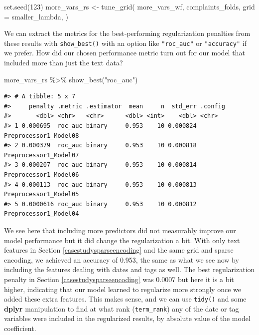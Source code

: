 \documentclass[
]{krantz}
\makeatletter
\newenvironment{Shaded}{\begin{snugshade}}{\end{snugshade}}
\newcommand{\AttributeTok}[1]{\textcolor[rgb]{0.77,0.63,0.00}{#1}}
\newcommand{\DecValTok}[1]{\textcolor[rgb]{0.00,0.00,0.81}{#1}}
\newcommand{\FunctionTok}[1]{\textcolor[rgb]{0.00,0.00,0.00}{#1}}
\newcommand{\NormalTok}[1]{#1}
\newcommand{\OtherTok}[1]{\textcolor[rgb]{0.56,0.35,0.01}{#1}}
\newcommand{\SpecialCharTok}[1]{\textcolor[rgb]{0.00,0.00,0.00}{#1}}
\newcommand{\StringTok}[1]{\textcolor[rgb]{0.31,0.60,0.02}{#1}}
\newenvironment{kframe}{%
\medskip{}
\setlength{\fboxsep}{.8em}
 \def\at@end@of@kframe{}%
 \ifinner\ifhmode%
  \def\at@end@of@kframe{\end{minipage}}%
  \begin{minipage}{\columnwidth}%
 \fi\fi%
 \def\FrameCommand##1{\hskip\@totalleftmargin \hskip-\fboxsep
 \colorbox{shadecolor}{##1}\hskip-\fboxsep
     \hskip-\linewidth \hskip-\@totalleftmargin \hskip\columnwidth}%
 \MakeFramed {\advance\hsize-\width
   \@totalleftmargin\z@ \linewidth\hsize
   \@setminipage}}%
 {\par\unskip\endMakeFramed%
 \at@end@of@kframe}
\renewenvironment{Shaded}{\begin{kframe}}{\end{kframe}}
\makeatother
\begin{document}
\begin{Shaded}
\begin{Highlighting}[]
\FunctionTok{set.seed}\NormalTok{(}\DecValTok{123}\NormalTok{)}
\NormalTok{more\_vars\_rs }\OtherTok{\textless{}{-}} \FunctionTok{tune\_grid}\NormalTok{(}
\NormalTok{  more\_vars\_wf,}
\NormalTok{  complaints\_folds,}
  \AttributeTok{grid =}\NormalTok{ smaller\_lambda,}
\NormalTok{)}
\end{Highlighting}
\end{Shaded}

We can extract the metrics for the best-performing regularization penalties from these results with \texttt{show\_best()} with an option like \texttt{"roc\_auc"} or \texttt{"accuracy"} if we prefer. How did our chosen performance metric turn out for our model that included more than just the text data?

\begin{Shaded}
\begin{Highlighting}[]
\NormalTok{more\_vars\_rs }\SpecialCharTok{\%\textgreater{}\%}
  \FunctionTok{show\_best}\NormalTok{(}\StringTok{"roc\_auc"}\NormalTok{)}
\end{Highlighting}
\end{Shaded}

\begin{verbatim}
#> # A tibble: 5 x 7
#>     penalty .metric .estimator  mean     n  std_err .config              
#>       <dbl> <chr>   <chr>      <dbl> <int>    <dbl> <chr>                
#> 1 0.000695  roc_auc binary     0.953    10 0.000824 Preprocessor1_Model08
#> 2 0.000379  roc_auc binary     0.953    10 0.000818 Preprocessor1_Model07
#> 3 0.000207  roc_auc binary     0.953    10 0.000814 Preprocessor1_Model06
#> 4 0.000113  roc_auc binary     0.953    10 0.000813 Preprocessor1_Model05
#> 5 0.0000616 roc_auc binary     0.953    10 0.000812 Preprocessor1_Model04
\end{verbatim}

We see here that including more predictors did not measurably improve our model performance but it did change the regularization a bit. With only text features in Section \ref{casestudysparseencoding} and the same grid and sparse encoding, we achieved an accuracy of 0.953, the same as what we see now by including the features dealing with dates and tags as well. The best regularization penalty in Section \ref{casestudysparseencoding} was 0.0007 but here it is a bit higher, indicating that our model learned to regularize more strongly once we added these extra features. This makes sense, and we can use \texttt{tidy()} and some \textbf{dplyr} manipulation to find at what rank (\texttt{term\_rank}) any of the date or tag variables were included in the regularized results, by absolute value of the model coefficient.
\end{document}
